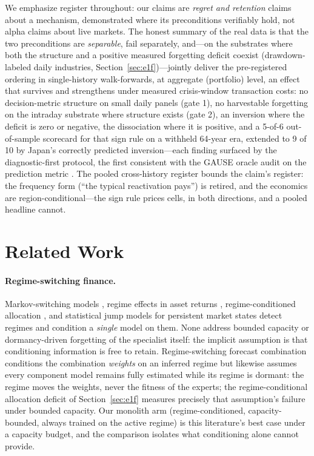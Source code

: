 \documentclass{article}
\begin{document}
We emphasize register throughout: our claims are \emph{regret and retention}
claims about a mechanism, demonstrated where its preconditions verifiably
hold, not alpha claims about live markets. The honest summary of the real
data is that the two preconditions are \emph{separable}, fail separately,
and---on the substrates where both the structure and a positive
measured forgetting deficit coexist (drawdown-labeled daily industries,
Section~\ref{sec:e1f})---jointly deliver the pre-registered ordering in
single-history walk-forwards, at aggregate (portfolio) level, an effect
that survives and strengthens under measured crisis-window transaction
costs: no decision-metric structure on small daily panels (gate 1), no
harvestable forgetting on the intraday substrate where structure exists
(gate 2), an inversion where the deficit is zero or negative, the
dissociation where it is positive, and a 5-of-6 out-of-sample scorecard
for that sign rule on a withheld 64-year era, extended to 9 of 10 by
Japan's correctly predicted inversion---each finding surfaced by
the diagnostic-first protocol, the first consistent with the GAUSE
oracle audit on the prediction metric \citep{li2026gause}. The
pooled cross-history register bounds the claim's register: the
frequency form (``the typical reactivation pays'') is retired, and
the economics are region-conditional---the sign rule prices cells,
in both directions, and a pooled headline cannot.

\section{Related Work}

\paragraph{Regime-switching finance.} Markov-switching models
\citep{hamilton1989new}, regime effects in asset returns
\citep{ang2002international, ang2012regime}, regime-conditioned allocation
\citep{guidolin2007asset, nystrup2018dynamic}, and statistical jump models
for persistent market states \citep{nystrup2020greedy} detect regimes and
condition a \emph{single} model on them. None address bounded capacity or
dormancy-driven forgetting of the specialist itself: the implicit assumption
is that conditioning information is free to retain. Regime-switching
forecast combination \citep{elliott2005optimal} conditions the
combination \emph{weights} on an inferred regime but likewise assumes
every component model remains fully estimated while its regime is
dormant: the regime moves the weights, never the fitness of the
experts; the regime-conditional allocation deficit of
Section~\ref{sec:e1f} measures precisely that assumption's failure
under bounded capacity. Our monolith arm
(regime-conditioned, capacity-bounded, always trained on the active regime)
is this literature's best case under a capacity budget, and the comparison
isolates what conditioning alone cannot provide.
\end{document}
